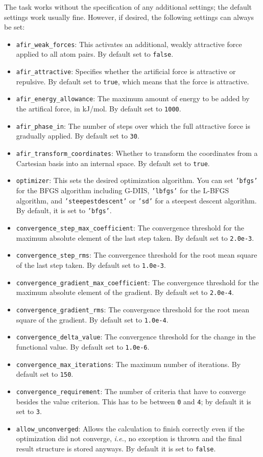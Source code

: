 \documentclass[]{tufte-book}
\begin{document}
The task works without the specification of any additional settings; the default settings work usually fine. However,
if desired, the following settings can always be set:
\begin{itemize}
\item \texttt{afir\_weak\_forces}: This activates an additional, weakly attractive force applied to all atom pairs. By 
default set to \texttt{false}.
\item \texttt{afir\_attractive}: Specifies whether the artificial force is attractive or repulsive. By default set to
\texttt{true}, which means that the force is attractive.
\item \texttt{afir\_energy\_allowance}: The maximum amount of energy to be added by the artifical force, in kJ/mol.
By default set to \texttt{1000}.
\item \texttt{afir\_phase\_in}: The number of steps over which the full attractive force is gradually applied. By default
set to \texttt{30}.
\item \texttt{afir\_transform\_coordinates}: Whether to transform the coordinates from a Cartesian basis into an internal 
space. By default set to \texttt{true}.
\item \texttt{optimizer}: This sets the desired optimization algorithm. You can set \texttt{'bfgs'} for the BFGS algorithm including
G-DIIS, \texttt{'lbfgs'} for the L-BFGS algorithm, and
\texttt{'steepestdescent'} or \texttt{'sd'} for a steepest descent algorithm. By default, it is set to \texttt{'bfgs'}.
\item \texttt{convergence\_step\_max\_coefficient}: The convergence threshold for the maximum absolute element of the last step taken.
By default set to \texttt{2.0e-3}.
\item \texttt{convergence\_step\_rms}: The convergence threshold for the root mean square of the last step taken. By default set to 
\texttt{1.0e-3}.
\item \texttt{convergence\_gradient\_max\_coefficient}: The convergence threshold for the maximum absolute element of the gradient. 
By default set to \texttt{2.0e-4}.
\item \texttt{convergence\_gradient\_rms}: The convergence threshold for the root mean square of the gradient. By default set to 
\texttt{1.0e-4}.
\item \texttt{convergence\_delta\_value}: The convergence threshold for the change in the functional value. By default set to
\texttt{1.0e-6}.
\item \texttt{convergence\_max\_iterations}: The maximum number of iterations. By default set to \texttt{150}.
\item \texttt{convergence\_requirement}: The number of criteria that have to converge besides the value criterion. This 
has to be between \texttt{0} and \texttt{4}; by default it is set to \texttt{3}.
\item \texttt{allow\_unconverged}: Allows the calculation to finish correctly even if the optimization did not 
converge, \textit{i.e.}, no exception is thrown and the final result structure is stored anyways. By default it is set to \texttt{false}.
\end{itemize}
\end{document}
